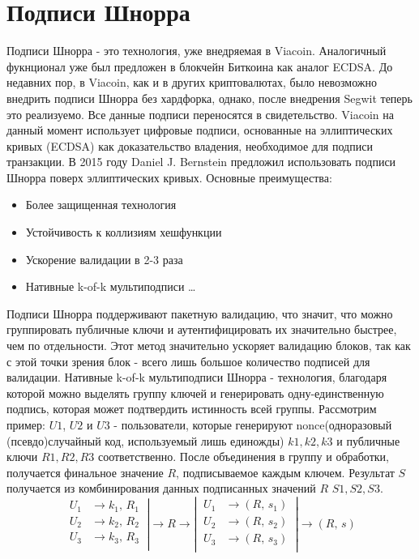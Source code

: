 \documentclass{article}
\begin{document}
\section{Подписи Шнорра}\label{sec: Schnorr signature}
Подписи Шнорра - это технология, уже внедряемая в Viacoin. Аналогичный фукнционал уже был предложен в блокчейн Биткоина как аналог ECDSA. До недавних пор, в Viacoin, как и в других криптовалютах, было невозможно внедрить подписи Шнорра без хардфорка, однако, после внедрения Segwit теперь это реализуемо. Все данные подписи переносятся в свидетельство. Viacoin на данный момент использует цифровые подписи, основанные на эллиптических кривых (ECDSA) как доказательство владения, необходимое для подписи транзакции. В 2015 году Daniel J. Bernstein предложил использовать подписи Шнорра поверх эллиптических кривых.
\newline \newline
Основные преимущества:
\begin{itemize}
\item Более защищенная технология
\item Устойчивость к коллизиям хешфункции
\item Ускорение валидации в 2-3 раза
\item Нативные k-of-k мультиподписи \ldots
\end{itemize}
\noindent
Подписи Шнорра поддерживают пакетную валидацию, что значит, что можно группировать публичные ключи и аутентифицировать их значительно быстрее, чем по отдельности. Этот метод значительно ускоряет валидацию блоков, так как с этой точки зрения блок - всего лишь большое количество подписей для валидации.
\linebreak \noindent
Нативные k-of-k мультиподписи Шнорра - технология, благодаря которой можно выделять группу ключей и генерировать одну-единственную подпись, которая может подтвердить истинность всей группы. Рассмотрим пример: $U1$, $U2$ и $U3$ - пользователи, которые генерируют nonce(одноразовый (псевдо)случайный код, используемый лишь единожды) $k1, k2, k3$ и публичные ключи $R1, R2, R3 $ соответственно. После объединения в группу и обработки, получается финальное значение $R$, подписываемое каждым ключем. Результат $S$ получается из комбинирования данных подписанных значений $R$ $S1, S2, S3$.
\linebreak
\begin{equation*}
\left.
    \begin{aligned}
        U_{1} &\rightarrow k_{1},\, R_{1} \\
        U_{2} &\rightarrow k_{2},\, R_{2} \\
        U_{3} &\rightarrow k_{3},\, R_{3} \\
    \end{aligned}
\
\right|
\longrightarrow
R
\longrightarrow
\left|
\
    \begin{aligned}
        U_{1} &\rightarrow (R,\, s_{1}) \\
        U_{2} &\rightarrow (R,\, s_{2}) \\
        U_{3} &\rightarrow (R,\, s_{3}) \\
    \end{aligned}
\
\right|
\longrightarrow
(R,\, s)
\end{equation*}
\end{document}

